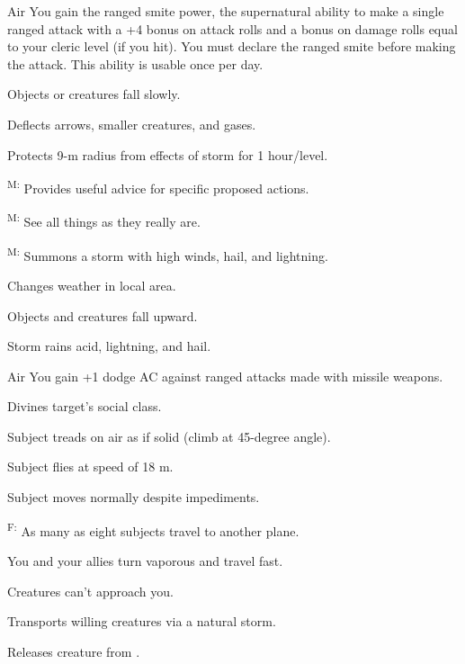 {Air}
{You gain the ranged smite power, the supernatural ability to make a single ranged attack with a +4 bonus on attack rolls and a bonus on damage rolls equal to your cleric level (if you hit). You must declare the ranged smite before making the attack. This ability is usable once per day.}
{
	\item {} Objects or creatures fall slowly.
	\item {} Deflects arrows, smaller creatures, and gases.
	\item {} Protects 9-m radius from effects of storm for 1 hour/level.
	\item {}\textsuperscript{M:} Provides useful advice for specific proposed actions.
	\item {}\textsuperscript{M:} See all things as they really are.
	\item {}\textsuperscript{M:} Summons a storm with high winds, hail, and lightning.
	\item {} Changes weather in local area.
	\item {} Objects and creatures fall upward.
	\item {} Storm rains acid, lightning, and hail.
}

{Air}
{You gain +1 dodge AC against ranged attacks made with missile weapons.}
{
	\item {} Divines target's social class.
	\item {} Subject treads on air as if solid (climb at 45-degree angle). 
	\item {} Subject flies at speed of 18 m.
	\item {} Subject moves normally despite impediments.
	\item {}\textsuperscript{F:} As many as eight subjects travel to another plane.
	\item {} You and your allies turn vaporous and travel fast.
	\item {} Creatures can't approach you.
	\item {} Transports willing creatures via a natural storm.
	\item {} Releases creature from .
}

